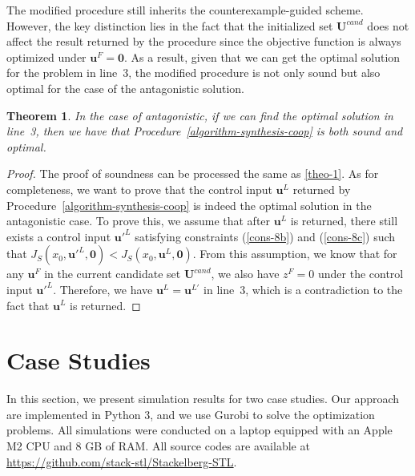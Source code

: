 \documentclass[letterpaper, 10 pt, conference]{ieeeconf}
\newtheorem{theorem}{\bf Theorem}
\begin{document}
The modified procedure still inherits the  counterexample-guided scheme. However, the key distinction lies in the fact that the initialized set $\mathbf{U}^{cand}$ does not affect the result returned by the procedure since the objective function is always optimized under $\mathbf{u}^F=\mathbf{0}$.
As a result, given that we can get the optimal solution for the problem in line~3, the modified procedure is not only sound but also optimal for the case of the antagonistic solution. 
\begin{theorem}
    In the case of antagonistic, if we can find the optimal solution in line~3, then we have that Procedure~\ref{algorithm-synthesis-coop} is both sound and optimal.
\end{theorem}
\begin{proof}
    The proof of soundness can be processed the same as \ref{theo-1}. As for completeness, we want to prove that the control input $\mathbf{u}^L$ returned by Procedure~\ref{algorithm-synthesis-coop} is indeed the optimal solution in the antagonistic case.
    To prove this, we assume that after $\mathbf{u}^L$ is returned, there still exists a control input $\mathbf{u}'^{L}$ satisfying constraints (\ref{cons-8b}) and (\ref{cons-8c}) such that $J_S(x_0, \mathbf{u}'^{L},\mathbf{0})<J_S(x_0, \mathbf{u}^L,\mathbf{0})$. From this assumption, we know that for any $\mathbf{u}^F$ in the current candidate set $\mathbf{U}^{cand}$, we also have $z^F=0$ under the control input $\mathbf{u}'^{L}$. Therefore, we have $\mathbf{u}^L=\mathbf{u}^{L'}$ in line~3, which is a contradiction to the fact that $\mathbf{u}^L$ is returned.
\end{proof}

\section{Case Studies}\label{sec-case}
In this section, we present simulation results for two case studies. Our approach are implemented in \textsf{Python 3}, and we use \textsf{Gurobi} to solve the optimization problems. All simulations were conducted on a laptop equipped with an Apple M2 CPU and 8 GB of RAM. All source codes are available at 
\href{https://github.com/stack-stl/Stackelberg-STL}{https://github.com/stack-stl/Stackelberg-STL}.
\end{document}
